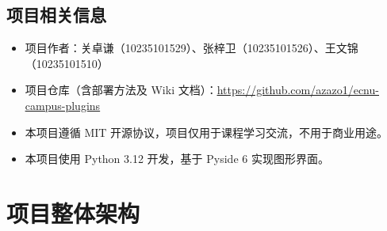 \documentclass[14pt,a4paper,UTF8,twoside]{article}
\begin{document}
\subsection{项目相关信息}

\begin{itemize}
    \item 项目作者：关卓谦（10235101529）、张梓卫（10235101526）、王文锦（10235101510）
    \item 项目仓库（含部署方法及 Wiki 文档）：\href{https://github.com/azazo1/ecnu-campus-plugins}{\underline{https://github.com/azazo1/ecnu-campus-plugins}}
    \item 本项目遵循 MIT 开源协议，项目仅用于课程学习交流，不用于商业用途。
    \item 本项目使用 Python 3.12 开发，基于 Pyside 6 实现图形界面。
\end{itemize}

\section{项目整体架构}
\end{document}
